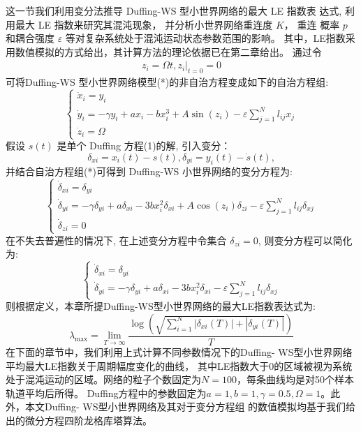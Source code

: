这一节我们利用变分法推导 Duffing-WS 型小世界网络的最大 LE 指数表 达式, 利用最大 LE 指数来研究其混沌现象，
并分析小世界网络重连度 $K$， 重连 概率 $p$ 和耦合强度 $\varepsilon$ 等对复杂系统处于混沌运动状态参数范围的影响。
其中，LE指数采用数值模拟的方式给出，其计算方法的理论依据已在第二章给出。
通过令
\begin{eqnarray*}
z_i=\Omega t,\left. z_i\right|_{t=0}=0
\end{eqnarray*}
可将Duffing-WS 型小世界网络模型(*)的非自治方程变成如下的自治方程组:
 \begin{equation}
    \left\{\begin{array}{l}
    \dot{x}_i=y_i \\
    \dot{y}_i=-\gamma y_i+a x_i-b x_i^3+A \sin \left(z_i\right)-\varepsilon \sum_{j=1}^N l_{i j} x_j \\
    \dot{z}_i=\Omega
    \end{array}\right.
\end{equation}
假设 $s(t)$ 是单个 Duffing 方程(1)的解, 引入变分：
\begin{equation}
    \delta_{x i}=x_i(t)-s(t), \delta_{y i}=y_i(t)-\dot{s}(t),
\end{equation}
并结合自治方程组(*)可得到 Duffing-WS 小世界网络的变分方程为:
\begin{equation}
    \left\{\begin{array}{l}
    \dot{\delta}_{x i}=\delta_{y i} \\
    \dot{\delta}_{y i}=-\gamma \delta_{y i}+a \delta_{x i}-3 b x_i^2 \delta_{x i}+A \cos \left(z_i\right) \delta_{z i}-\varepsilon \sum_{j=1}^N l_{i j} \delta_{x j} \\
    \dot{\delta}_{z i}=0
    \end{array}\right.
\end{equation}
在不失去普遍性的情况下, 在上述变分方程中令集合 $\delta_{z i}=0$, 则变分方程可以简化为:
\begin{equation}
    \left\{\begin{array}{l}
    \dot{\delta}_{x i}=\delta_{y i} \\
    \dot{\delta}_{y i}=-\gamma \delta_{y i}+a \delta_{x i}-3 b x_i^2 \delta_{x i}-\varepsilon \sum_{j=1}^N l_{i j} \delta_{x j}
    \end{array}\right.
\end{equation}
则根据定义，本章所提Duffing-WS型小世界网络的最大LE指数表达式为:
\begin{equation}
    \lambda_{\max }=\lim _{T \rightarrow \infty} \frac{\log \left(\sqrt{\sum_{i=1}^N\left|\delta_{x i}(T)\right|+\left|\delta_{y i}(T)\right|}\right)}{T}
\end{equation}
在下面的章节中，我们利用上式计算不同参数情况下的Duffing- WS型小世界网络平均最大LE指数关于周期幅度变化的曲线，
其中LE指数大于0的区域被视为系统处于混沌运动的区域。网络的粒子个数固定为$N=100$，每条曲线均是对50个样本轨道平均后所得。
Duffing方程中的参数固定为$a=1,b=1,\gamma=0.5,\Omega=1$。此外，本文Duffing- WS型小世界网络及其对于变分方程组
的数值模拟均基于我们给出的微分方程四阶龙格库塔算法。
